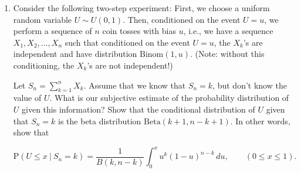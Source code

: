 \documentclass[11pt]{report}
\theoremstyle{plain}
\theoremstyle{definition}
\begin{document}
\begin{enumerate}[label=\arabic*.]
\[
T_n = \min\{ k : X_k = X_m\textrm{ for some }m<k\}.
\]

\noindent If the $X_j$'s represent the birthdays of some
sequence of people on a planet in which the calendar
year has $n$ days, then $T_n$ represents the number
of people in the list who have to declare their
birthdays before two people are found to have the same
birthday. Show that

\[
\mathrm{P}(T_n > k) = \prod_{m=1}^{k-1} \left(1-\frac{m}{n}\right), \qquad (k\ge 2),
\]

\noindent and use this to prove that

\[
\frac{T_n}{\sqrt{n}} \implies F_{\textrm{birthday}},
\]

\noindent where $F_{\textrm{birthday}}$ is the distribution
function defined by

\[
F_{\textrm{birthday}}(x) = \begin{cases} 0 & x<0, \\ 1- e^{-x^2/2} & x\ge 0 \end{cases}
\]

\noindent (note: this is not the same as the normal
distribution!)

(b) Take $n=365$. Assuming that the approximation
$F_{T_n/\sqrt{n}} \approx F_{\textrm{birthday}}$ is
good for such a value of $n$, estimate what is the
minimal number of students that have to be put into a
classroom so that the probability that two of them
have the same birthday exceeds 50\%. (Ignore leap
years, and assume for simplicity that birthdays are
distributed uniformly throughout the year; in practice
this is not entirely true.)

\item Consider the following two-step experiment: First, we
choose a uniform random variable $U \sim U(0,1)$.
Then, conditioned on the event $U=u$, we perform a
sequence of $n$ coin tosses with bias $u$, i.e., we
have a sequence $X_1,X_2,\ldots,X_n$ such that
conditioned on the event $U=u$, the $X_k$'s are
independent and have distribution
$\textrm{Binom}(1,u)$. (Note: without this
conditioning, the $X_k$'s are not independent!)

Let $S_n = \sum_{k=1}^n X_k$. Assume that we know
that $S_n=k$, but don't know the value of $U$. What
is our subjective estimate of the probability
distribution of $U$ given this information? Show that
the conditional distribution of $U$ given that
$S_n = k$ is the beta distribution
$\textrm{Beta}(k+1,n-k+1)$. In other words, show that

\[
\mathrm{P}(U \le x\ |\ S_n = k) = \frac{1}{B(k,n-k)} \int_0^x u^k (1-u)^{n-k}\,du, \qquad (0\le x\le 1).
\]


\end{enumerate}
\end{document}
